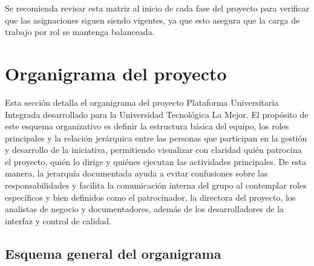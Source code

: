 \documentclass[11pt,spanish]{article}
\begin{document}
Se recomienda revisar esta matriz al inicio de cada fase del proyecto para verificar que las asignaciones siguen siendo vigentes, ya que esto asegura que la carga de trabajo por rol se mantenga balanceada.

\newpage
\section{Organigrama del proyecto}

Esta sección detalla el organigrama del proyecto Plataforma Universitaria Integrada desarrollado para la Universidad Tecnológica La Mejor. El propósito de este esquema organizativo es definir la estructura básica del equipo, los roles principales y la relación jerárquica entre las personas que participan en la gestión y desarrollo de la iniciativa, permitiendo visualizar con claridad quién patrocina el proyecto, quién lo dirige y quiénes ejecutan las actividades principales. De esta manera, la jerarquía documentada ayuda a evitar confusiones sobre las responsabilidades y facilita la comunicación interna del grupo al contemplar roles específicos y bien definidos como el patrocinador, la directora del proyecto, los analistas de negocio y documentadores, además de los desarrolladores de la interfaz y control de calidad.

\subsection{Esquema general del organigrama}
\end{document}
